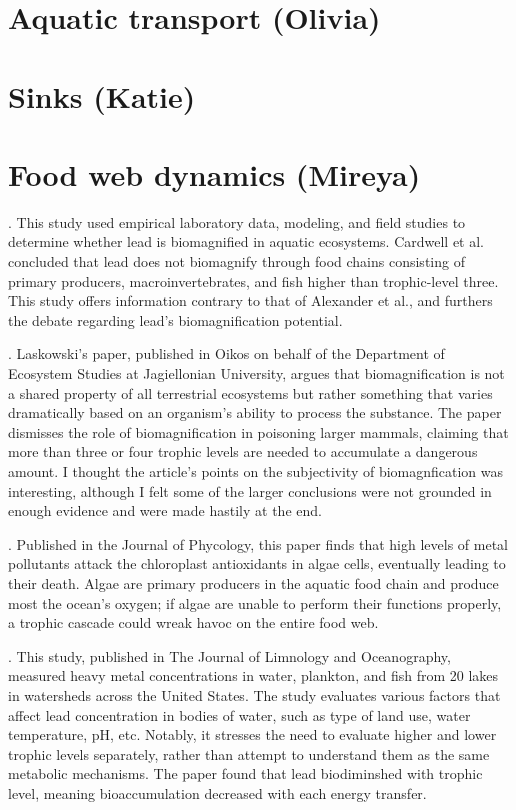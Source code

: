 \documentclass{article}\usepackage[]{graphicx}\usepackage[]{color}
\begin{document}
\section{Aquatic transport (Olivia)}

\section{Sinks (Katie)}

\section{Food web dynamics (Mireya)}

.
This study used empirical laboratory data, modeling, and field studies to determine whether lead is biomagnified in aquatic ecosystems. Cardwell et al. concluded that lead does not biomagnify through food chains consisting of primary producers, macroinvertebrates, and fish higher than trophic-level three. This study offers information contrary to that of Alexander et al., and furthers the debate regarding lead’s biomagnification potential. 

.
Laskowski’s paper, published in Oikos on behalf of the Department of Ecosystem Studies at Jagiellonian University, argues that biomagnification is not a shared property of all terrestrial ecosystems but rather something that varies dramatically based on an organism’s ability to process the substance.  The paper dismisses the role of biomagnification in poisoning larger mammals, claiming that more than three or four trophic levels are needed to accumulate a dangerous amount. I thought the article’s points on the subjectivity of biomagnfication was interesting, although I felt some of the larger conclusions were not grounded in enough evidence and were made hastily at the end. 

.
Published in the Journal of Phycology, this paper finds that high levels of metal pollutants attack the chloroplast antioxidants in algae cells, eventually leading to their death. Algae are primary producers in the aquatic food chain and produce most the ocean’s oxygen; if algae are unable to perform their functions properly, a trophic cascade could wreak havoc on the entire food web.  

.
This study, published in The Journal of Limnology and Oceanography, measured heavy metal concentrations in water, plankton, and fish from 20 lakes in watersheds across the United States. The study evaluates various factors that affect lead concentration in bodies of water, such as type of land use, water temperature, pH, etc. Notably, it stresses the need to evaluate higher and lower trophic levels separately, rather than attempt to understand them as the same metabolic mechanisms. The paper found that lead biodiminshed with trophic level, meaning bioaccumulation decreased with each energy transfer. 
\end{document}
